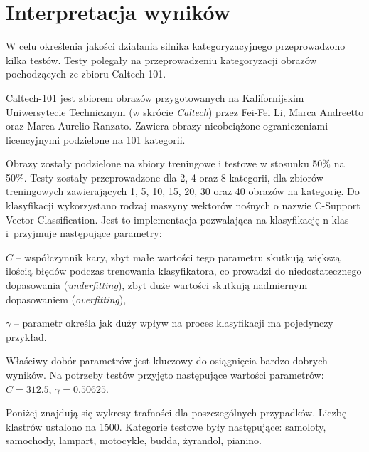 \chapter{Interpretacja wyników}

W celu określenia jakości działania silnika kategoryzacyjnego przeprowadzono kilka testów. Testy polegały na przeprowadzeniu kategoryzacji obrazów pochodzących ze zbioru Caltech-101.\cite{CALTECH101}

Caltech-101 jest zbiorem obrazów przygotowanych na Kalifornijskim Uniwersytecie Technicznym (w skrócie \emph{Caltech}) przez Fei-Fei Li, Marca Andreetto oraz Marca Aurelio Ranzato. Zawiera obrazy nieobciążone ograniczeniami licencyjnymi podzielone na 101 kategorii.

Obrazy zostały podzielone na zbiory treningowe i testowe w stosunku 50\% na 50\%. Testy zostały przeprowadzone dla 2, 4 oraz 8 kategorii, dla zbiorów treningowych zawierających 1, 5, 10, 15, 20, 30 oraz 40 obrazów na kategorię. Do klasyfikacji wykorzystano rodzaj maszyny wektorów nośnych o nazwie C-Support Vector Classification. Jest to implementacja pozwalająca na klasyfikację n klas i~przyjmuje następujące parametry:

\begin{compactitem}
	\item $C$ -- współczynnik kary, zbyt małe wartości tego parametru skutkują większą ilością błędów podczas trenowania klasyfikatora, co prowadzi do niedostatecznego dopasowania (\emph{underfitting}), zbyt duże wartości skutkują nadmiernym dopasowaniem (\emph{overfitting}),
	\item $\gamma$ -- parametr określa jak duży wpływ na proces klasyfikacji ma pojedynczy przykład.
\end{compactitem}

Właściwy dobór parametrów jest kluczowy do osiągnięcia bardzo dobrych wyników. Na potrzeby testów przyjęto następujące wartości parametrów: $C = 312.5$, $\gamma = 0.50625$.

Poniżej znajdują się wykresy trafności dla poszczególnych przypadków. Liczbę klastrów ustalono na 1500. Kategorie testowe były następujące: samoloty, samochody, lampart, motocykle, budda, żyrandol, pianino. 

